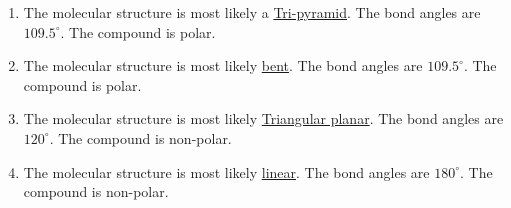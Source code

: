 \documentclass[12pt]{article}
\begin{document}
\begin{enumerate}
\begin{enumerate}
      \item {}

        \vspace{5pt}
        \begin{multicols}{2}
          \hspace{100pt}\hspace{20pt}
          The molecular structure is most likely a \underline{Tri-pyramid}. The bond angles are $109.5^{\circ}$. The compound is polar.
      \end{multicols}
        \vspace{5pt}

      \item {}

        \vspace{5pt}
        \begin{multicols}{2}
          \hspace{110pt}\hspace{20pt}
          The molecular structure is most likely \underline{bent}. The bond angles are $109.5^{\circ}$. The compound is polar.
      \end{multicols}
        \vspace{5pt}

      \item {}

        \vspace{5pt}
        \begin{multicols}{2}
          \hspace{110pt}\hspace{20pt}
          The molecular structure is most likely \underline{Triangular planar}. The bond angles are $120^{\circ}$. The compound is non-polar.
      \end{multicols}
        \vspace{5pt}

      \item {}

        \vspace{5pt}
        \begin{multicols}{2}
          \hspace{110pt}\hspace{20pt}
          The molecular structure is most likely \underline{linear}. The bond angles are $180^{\circ}$. The compound is non-polar.
      \end{multicols}
        \vspace{5pt}


\end{enumerate}
\end{enumerate}
\end{document}
